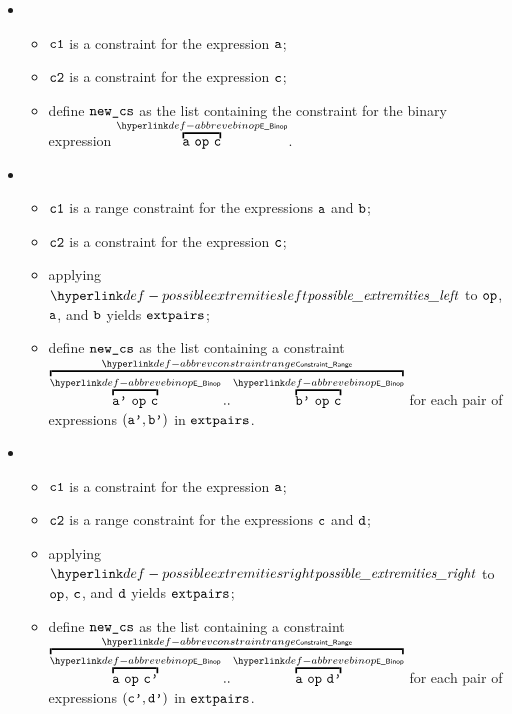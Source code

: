 \ProseParagraph
\OneApplies
\begin{itemize}
  \item {}
  \begin{itemize}
    \item $\texttt{c1}$ is a constraint for the expression $\texttt{a}$;
    \item $\texttt{c2}$ is a constraint for the expression $\texttt{c}$;
    \item define $\texttt{new\_cs}$ as the list containing the constraint for the binary expression $\AbbrevEBinop{\op}{\va}{\vc}$.
  \end{itemize}

  \item {}
  \begin{itemize}
    \item $\texttt{c1}$ is a range constraint for the expressions $\texttt{a}$ and $\texttt{b}$;
    \item $\texttt{c2}$ is a constraint for the expression $\texttt{c}$;
    \item applying $\possibleextremitiesleft$ to $\texttt{op}$, $\texttt{a}$, and $\texttt{b}$ yields $\texttt{extpairs}$;
    \item define $\texttt{new\_cs}$ as the list containing a constraint $\AbbrevConstraintRange{\AbbrevEBinop{\op}{\vap}{\vc}}{\AbbrevEBinop{\op}{\vbp}{\vc}}$
          for each pair of expressions $(\texttt{a'}, \texttt{b'})$ in $\texttt{extpairs}$.
  \end{itemize}

  \item {}
  \begin{itemize}
    \item $\texttt{c1}$ is a constraint for the expression $\texttt{a}$;
    \item $\texttt{c2}$ is a range constraint for the expressions $\texttt{c}$ and $\texttt{d}$;
    \item applying $\possibleextremitiesright$ to $\texttt{op}$, $\texttt{c}$, and $\texttt{d}$ yields $\texttt{extpairs}$;
    \item define $\texttt{new\_cs}$ as the list containing a constraint $\AbbrevConstraintRange{\AbbrevEBinop{\op}{\va}{\vcp}}{\AbbrevEBinop{\op}{\va}{\vdp}}$
          for each pair of expressions $(\texttt{c'}, \texttt{d'})$ in $\texttt{extpairs}$.
  \end{itemize}


\end{itemize}
